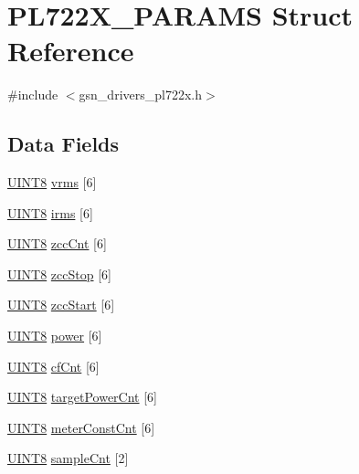 \hypertarget{a00453}{
\section{PL722X\_\-PARAMS Struct Reference}
\label{a00453}
}


{\ttfamily \#include $<$gsn\_\-drivers\_\-pl722x.h$>$}

\subsection*{Data Fields}
\begin{DoxyCompactItemize}
\item 
\hyperlink{a00660_gab27e9918b538ce9d8ca692479b375b6a}{UINT8} \hyperlink{a00453_afcfbca6af68960163f3b889c546aa6bb}{vrms} \mbox{[}6\mbox{]}
\item 
\hyperlink{a00660_gab27e9918b538ce9d8ca692479b375b6a}{UINT8} \hyperlink{a00453_aa18ebfa1e0ebb47331630a63a2d6e657}{irms} \mbox{[}6\mbox{]}
\item 
\hyperlink{a00660_gab27e9918b538ce9d8ca692479b375b6a}{UINT8} \hyperlink{a00453_a36a71f747a2c51fac53369d1eccdae26}{zccCnt} \mbox{[}6\mbox{]}
\item 
\hyperlink{a00660_gab27e9918b538ce9d8ca692479b375b6a}{UINT8} \hyperlink{a00453_a3347e23a9104c0610144e76e973ef77b}{zccStop} \mbox{[}6\mbox{]}
\item 
\hyperlink{a00660_gab27e9918b538ce9d8ca692479b375b6a}{UINT8} \hyperlink{a00453_ab73b1acc5f46baf8a7e24aa38f6df74d}{zccStart} \mbox{[}6\mbox{]}
\item 
\hyperlink{a00660_gab27e9918b538ce9d8ca692479b375b6a}{UINT8} \hyperlink{a00453_a1a369ad376c8f149942f3dca79d7a0fa}{power} \mbox{[}6\mbox{]}
\item 
\hyperlink{a00660_gab27e9918b538ce9d8ca692479b375b6a}{UINT8} \hyperlink{a00453_a03546b6ccb71deddb4051ae3bcf18c71}{cfCnt} \mbox{[}6\mbox{]}
\item 
\hyperlink{a00660_gab27e9918b538ce9d8ca692479b375b6a}{UINT8} \hyperlink{a00453_a9439d1b3ab5b7052aebaac942e868af8}{targetPowerCnt} \mbox{[}6\mbox{]}
\item 
\hyperlink{a00660_gab27e9918b538ce9d8ca692479b375b6a}{UINT8} \hyperlink{a00453_a9845b577b1bea115b200659a0ebfa3fe}{meterConstCnt} \mbox{[}6\mbox{]}
\item 
\hyperlink{a00660_gab27e9918b538ce9d8ca692479b375b6a}{UINT8} \hyperlink{a00453_a6c250bb82126608cbb957b1bbfe9fde2}{sampleCnt} \mbox{[}2\mbox{]}
\end{DoxyCompactItemize}


